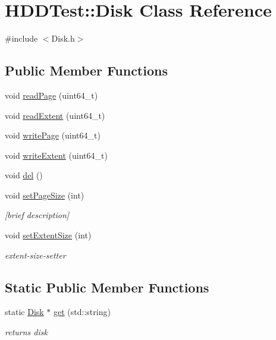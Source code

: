 \hypertarget{class_h_d_d_test_1_1_disk}{\section{H\-D\-D\-Test\-:\-:Disk Class Reference}
\label{class_h_d_d_test_1_1_disk}
}


{\ttfamily \#include $<$Disk.\-h$>$}

\subsection*{Public Member Functions}
\begin{DoxyCompactItemize}
\item 
void \hyperlink{class_h_d_d_test_1_1_disk_a5afff4786de776408acd86e3a91206c7}{read\-Page} (uint64\-\_\-t)
\item 
void \hyperlink{class_h_d_d_test_1_1_disk_adb3541b1531a7029e5d688f123df9baf}{read\-Extent} (uint64\-\_\-t)
\item 
void \hyperlink{class_h_d_d_test_1_1_disk_a538c61b9ff956231d7f05d19419eada1}{write\-Page} (uint64\-\_\-t)
\item 
void \hyperlink{class_h_d_d_test_1_1_disk_a4954ba9185b24bb98828934cb116b8dd}{write\-Extent} (uint64\-\_\-t)
\item 
void \hyperlink{class_h_d_d_test_1_1_disk_a08131fbb8f001b5f8b60056308f5a8da}{del} ()
\item 
void \hyperlink{class_h_d_d_test_1_1_disk_a161bd5f5921eb78bdd7a51757267e61b}{set\-Page\-Size} (int)
\begin{DoxyCompactList}\small\item\em \mbox{[}brief description\mbox{]} \end{DoxyCompactList}\item 
void \hyperlink{class_h_d_d_test_1_1_disk_a78e515afa9536ed390d317c1f595fe9e}{set\-Extent\-Size} (int)
\begin{DoxyCompactList}\small\item\em extent-\/size-\/setter \end{DoxyCompactList}\end{DoxyCompactItemize}
\subsection*{Static Public Member Functions}
\begin{DoxyCompactItemize}
\item 
static \hyperlink{class_h_d_d_test_1_1_disk}{Disk} $\ast$ \hyperlink{class_h_d_d_test_1_1_disk_a0f6006970c964527bb5a2e6e0cb16b87}{get} (std\-::string)
\begin{DoxyCompactList}\small\item\em returns disk \end{DoxyCompactList}\end{DoxyCompactItemize}
